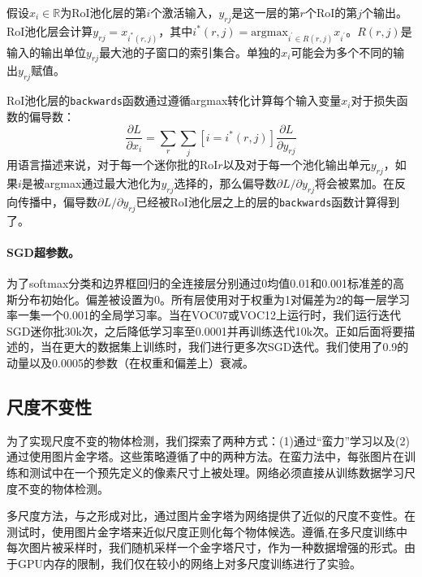 \documentclass[../main]{subfile}
\begin{document}
假设$x_i \in \mathbb{R}$为RoI池化层的第$i$个激活输入，$y_{rj}$是这一层的第$r$个RoI的第$j$个输出。RoI池化层会计算$y_{rj} = x_{i^*(r, j)}$，其中$i^*(r, j) = \text{argmax}_{i^{'}\in R(r, j)}x_{i^{'}}$。$R(r, j)$是输入的输出单位$y_{rj}$最大池的子窗口的索引集合。单独的$x_i$可能会为多个不同的输出$y_{rj}$赋值。

RoI池化层的\lstinline{backwards}函数通过遵循argmax转化计算每个输入变量$x_i$对于损失函数的偏导数：
\begin{equation}
    \frac{\partial L}{\partial x_i} = \sum_r \sum_j [i = i^*(r, j)] \frac{\partial L}{\partial y_{rj}}
\end{equation}
用语言描述来说，对于每一个迷你批的RoI$r$以及对于每一个池化输出单元$y_{rj}$，如果$i$是被argmax通过最大池化为$y_{rj}$选择的，那么偏导数$\partial L / \partial y_{rj}$将会被累加。在反向传播中，偏导数$\partial L / \partial y_{rj}$已经被RoI池化层之上的层的\lstinline{backwards}函数计算得到了。

\paragraph{SGD超参数。}为了softmax分类和边界框回归的全连接层分别通过0均值0.01和0.001标准差的高斯分布初始化。偏差被设置为0。所有层使用对于权重为1对偏差为2的每一层学习率一集一个0.001的全局学习率。当在VOC07或VOC12上运行时，我们运行迭代SGD迷你批30k次，之后降低学习率至0.0001并再训练迭代10k次。正如后面将要描述的，当在更大的数据集上训练时，我们进行更多次SGD迭代。我们使用了0.9的动量以及0.0005的参数（在权重和偏差上）衰减。

\subsection{尺度不变性}

为了实现尺度不变的物体检测，我们探索了两种方式：(1)通过“蛮力”学习以及(2)通过使用图片金字塔。这些策略遵循了\cite{spp}中的两种方法。在蛮力法中，每张图片在训练和测试中在一个预先定义的像素尺寸上被处理。网络必须直接从训练数据学习尺度不变的物体检测。

多尺度方法，与之形成对比，通过图片金字塔为网络提供了近似的尺度不变性。在测试时，使用图片金字塔来近似尺度正则化每个物体候选。遵循\cite{spp},在多尺度训练中每次图片被采样时，我们随机采样一个金字塔尺寸，作为一种数据增强的形式。由于GPU内存的限制，我们仅在较小的网络上对多尺度训练进行了实验。
\end{document}
